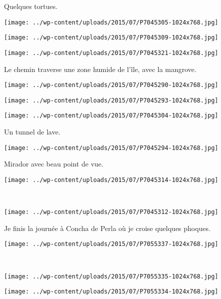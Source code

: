 Quelques tortues. 
\begin{center} \texttt{[image: ../wp-content/uploads/2015/07/P7045305-1024x768.jpg]} \end{center}
\begin{center} \texttt{[image: ../wp-content/uploads/2015/07/P7045309-1024x768.jpg]} \end{center}
\begin{center} \texttt{[image: ../wp-content/uploads/2015/07/P7045321-1024x768.jpg]} \end{center}

Le chemin traverse une zone humide de l'île, avec la mangrove. 
\begin{center} \texttt{[image: ../wp-content/uploads/2015/07/P7045290-1024x768.jpg]} \end{center}
\begin{center} \texttt{[image: ../wp-content/uploads/2015/07/P7045293-1024x768.jpg]} \end{center}
\vfill
\begin{center} \texttt{[image: ../wp-content/uploads/2015/07/P7045304-1024x768.jpg]} \end{center}
\vspace{-\topsep}
\vspace{-0.75mm}
\pagebreak

Un tunnel de lave. 
\begin{center} \texttt{[image: ../wp-content/uploads/2015/07/P7045294-1024x768.jpg]} \end{center}

Mirador avec beau point de vue. 
\begin{center} \texttt{[image: ../wp-content/uploads/2015/07/P7045314-1024x768.jpg]} \end{center}
\vspace{-\topsep}
\pagebreak
~
\begin{center} \texttt{[image: ../wp-content/uploads/2015/07/P7045312-1024x768.jpg]} \end{center}

Je finis la journée à Concha de Perla où je croise quelques phoques. 
\begin{center} \texttt{[image: ../wp-content/uploads/2015/07/P7055337-1024x768.jpg]} \end{center}
\vspace{-\topsep}
\pagebreak
~\\
\begin{center} \texttt{[image: ../wp-content/uploads/2015/07/P7055335-1024x768.jpg]} \end{center}
\begin{center} \texttt{[image: ../wp-content/uploads/2015/07/P7055334-1024x768.jpg]} \end{center}
\vspace{-\topsep}
\vspace{-2.75mm}
\pagebreak

